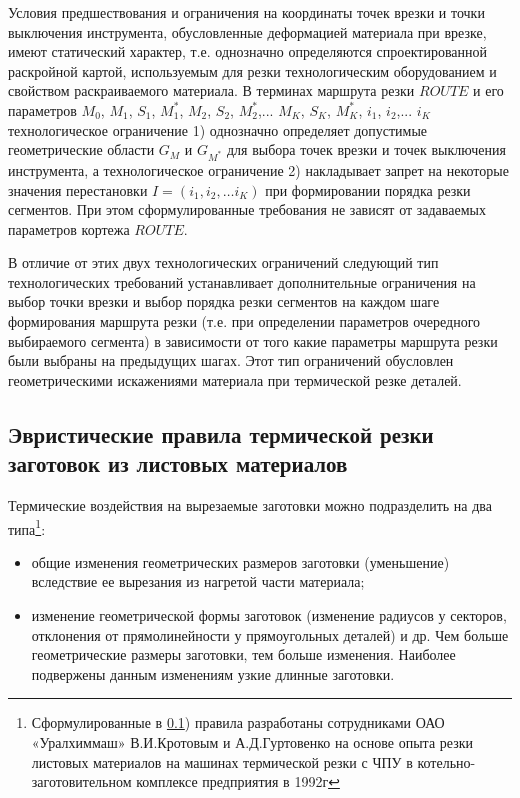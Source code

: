 \documentclass[12pt]{report}
\begin{document}
Условия предшествования и ограничения на координаты точек врезки
и точки выключения инструмента,
обусловленные деформацией материала при врезке,
имеют статический характер,
т.е. однозначно определяются спроектированной раскройной картой,
используемым для резки технологическим оборудованием
и свойством раскраиваемого материала.
В терминах маршрута резки $ROUTE$
и его параметров
$M_0$, $M_1$, $S_1$, $M_1^*$, $M_2$, $S_2$, $M_2^*$,... $M_K$, $S_K$, $M_K^*$,
$i_1$, $i_2$,... $i_K$
технологическое ограничение
1) однозначно определяет допустимые геометрические области
$G_M$
и
$G_{M^*}$
для выбора точек врезки и точек выключения инструмента,
а технологическое ограничение
2) накладывает запрет на некоторые значения перестановки
$ I = (i_1, i_2, \dots i_K)$
при формировании порядка резки сегментов. При
этом сформулированные требования не зависят от задаваемых параметров кортежа
$ROUTE$.

В отличие от этих двух технологических ограничений
следующий тип технологических требований устанавливает
дополнительные ограничения на выбор точки врезки и выбор
порядка резки сегментов на каждом шаге формирования маршрута резки
(т.е. при определении параметров очередного выбираемого сегмента)
в зависимости от того какие параметры маршрута резки были выбраны на предыдущих шагах.
Этот тип ограничений обусловлен геометрическими
искажениями материала при термической резке деталей.

\subsection{Эвристические правила термической резки заготовок из листовых материалов}
\label{Par133}

Термические воздействия на вырезаемые заготовки можно подразделить на два типа\footnote{
  Сформулированные в \ref{Par133})
  правила разработаны сотрудниками ОАО «Уралхиммаш»
  В.И.Кротовым и А.Д.Гуртовенко на основе опыта
  резки листовых материалов на машинах термической резки с ЧПУ
  в котельно-заготовительном комплексе предприятия в 1992г
}:

\begin{itemize}
\item общие изменения геометрических размеров заготовки (уменьшение)
вследствие ее вырезания из нагретой части материала;
\item	изменение геометрической формы заготовок
(изменение радиусов у секторов,
отклонения от прямолинейности у прямоугольных деталей) и др.
Чем больше геометрические размеры заготовки,
тем больше изменения.
Наиболее  подвержены данным изменениям узкие длинные заготовки.
\end{itemize}
\end{document}
